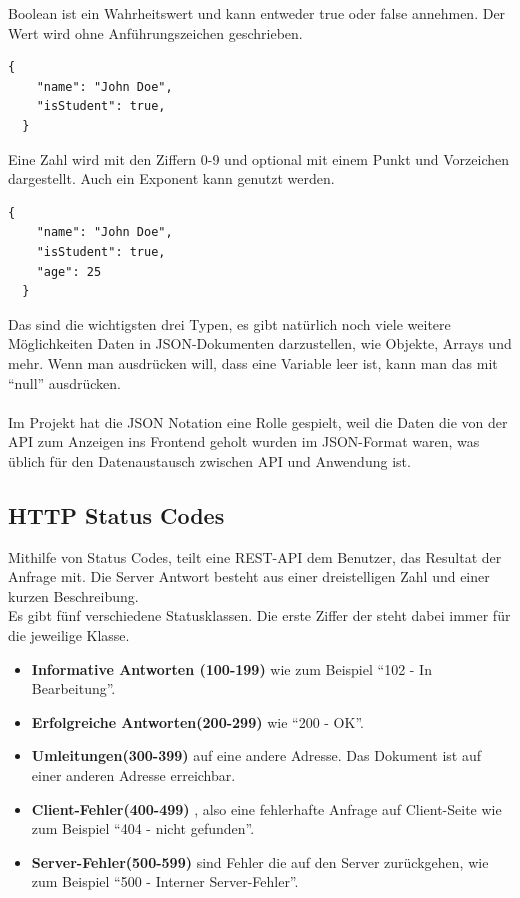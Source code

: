 Boolean ist ein Wahrheitswert und kann entweder true oder false annehmen. Der Wert wird ohne Anführungszeichen geschrieben.
\begin{lstlisting}[caption=JSON Datentyp Boolean]
  {
    "name": "John Doe",
    "isStudent": true,
  }
\end{lstlisting}

Eine Zahl wird mit den Ziffern 0-9 und optional mit einem Punkt und Vorzeichen dargestellt. Auch ein Exponent kann 
genutzt werden. 
\begin{lstlisting}[caption=JSON Datentyp Number]
  {
    "name": "John Doe",
    "isStudent": true,
    "age": 25
  }
\end{lstlisting}

Das sind die wichtigsten drei Typen, es gibt natürlich noch viele weitere Möglichkeiten Daten in JSON-Dokumenten darzustellen, wie
Objekte, Arrays und mehr. Wenn man ausdrücken will, dass eine Variable leer ist, kann man das mit ``null'' ausdrücken. 
\cite{APCW20014}
\\
\\
Im Projekt hat die JSON Notation eine Rolle gespielt, weil die Daten die von der API zum Anzeigen ins Frontend geholt wurden 
im JSON-Format waren, was üblich für den Datenaustausch zwischen API und Anwendung ist.


\subsection{HTTP Status Codes}
Mithilfe von Status Codes, teilt eine REST-API dem Benutzer, das Resultat der Anfrage mit.
Die Server Antwort besteht aus einer dreistelligen Zahl und einer kurzen
Beschreibung.
\\
Es gibt fünf verschiedene Statusklassen. Die erste Ziffer der steht dabei immer 
für die jeweilige Klasse.

\begin{itemize}
  \item {\textbf{Informative Antworten (100-199)} wie zum Beispiel ``102 - In Bearbeitung''. }
  \item {\textbf{Erfolgreiche Antworten(200-299)} wie ``200 - OK''. }
  \item {\textbf{Umleitungen(300-399)} auf eine andere Adresse. Das Dokument ist auf einer anderen Adresse
  erreichbar. }
  \item {\textbf{Client-Fehler(400-499)} , also eine fehlerhafte Anfrage auf Client-Seite wie zum Beispiel
  ``404 - nicht gefunden''. }
  \item {\textbf{Server-Fehler(500-599)} sind Fehler die auf den Server zurückgehen, wie 
  zum Beispiel ``500 - Interner Server-Fehler''. }
\end{itemize} \cite{APCW20015}



